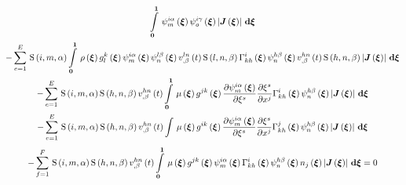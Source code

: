 \begin{multline}
{    \gint{\vectr{0}}{\vectr{1}}{\idxgbfn{i}{m}{\alpha}{\vectr{\xi}}\idxgbfn{i}{o}{\gamma}{\vectr{\xi}}
      \abs{\fnof{\matr{J}}{\vectr{\xi}}}}{\vectr{\xi}}}\\
  -\gsum{e=1}{E}{\idxgsf{i}{m}{\alpha}\gint{\vectr{0}}{\vectr{1}}{\fnof{\rho}{\vectr{\xi}}
      \fnof{g^{k}_{l}}{\vectr{\xi}}\idxgbfn{i}{m}{\alpha}{\vectr{\xi}}\idxgbfn{l}{n}{\beta}{\vectr{\xi}}
      \fnof{\idxnodedof{v}{l}{n}{\beta}}{t}\idxgsf{l}{n}{\beta}
      \fnof{\christoffel{i}{k}{h}}{\vectr{\xi}}
      \idxgbfn{h}{n}{\beta}{\vectr{\xi}}\fnof{\idxnodedof{v}{h}{n}{\beta}}{t}\idxgsf{h}{n}{\beta}
      \abs{\fnof{\matr{J}}{\vectr{\xi}}}}{\vectr{\xi}}}\\
  -\gsum{e=1}{E}{\idxgsf{i}{m}{\alpha}\idxgsf{h}{n}{\beta}\fnof{\idxnodedof{v}{h}{n}{\beta}}{t}
    \gint{\vectr{0}}{\vectr{1}}{\fnof{\mu}{\vectr{\xi}}\fnof{g^{jk}}{\vectr{\xi}}
      \delby{\idxgbfn{i}{m}{\alpha}{\vectr{\xi}}}{\xi^{s}}\delby{\xi^{s}}{x^{j}}
      \fnof{\christoffel{i}{k}{h}}{\vectr{\xi}}\idxgbfn{h}{n}{\beta}{\vectr{\xi}}    
    \abs{\fnof{\matr{J}}{\vectr{\xi}}}}{\vectr{\xi}}}\\
  -\gsum{e=1}{E}{\idxgsf{i}{m}{\alpha}\idxgsf{h}{n}{\beta}\fnof{\idxnodedof{v}{h}{n}{\beta}}{t}
    \gint{}{}{\fnof{\mu}{\vectr{\xi}}\fnof{g^{ik}}{\vectr{\xi}}
      \delby{\idxgbfn{i}{m}{\alpha}{\vectr{\xi}}}{\xi^{s}}\delby{\xi^{s}}{x^{j}}
      \fnof{\christoffel{j}{k}{h}}{\vectr{\xi}}\idxgbfn{h}{n}{\beta}{\vectr{\xi}}        
    \abs{\fnof{\matr{J}}{\vectr{\xi}}}}{\vectr{\xi}}}\\
  -\gsum{f=1}{F}{\idxgsf{i}{m}{\alpha}\idxgsf{h}{n}{\beta}\fnof{\idxnodedof{v}{h}{n}{\beta}}{t}
    \gint{\vectr{0}}{\vectr{1}}{\fnof{\mu}{\vectr{\xi}}\fnof{g^{jk}}{\vectr{\xi}}\idxgbfn{i}{m}{\alpha}{\vectr{\xi}}
      \fnof{\christoffel{i}{k}{h}}{\vectr{\xi}}\idxgbfn{h}{n}{\beta}{\vectr{\xi}}\fnof{n_{j}}{\vectr{\xi}}
      \abs{\fnof{\matr{J}}{\vectr{\xi}}}}{\vectr{\xi}}}=0
  \label{eqn:NSEFEM4}
\end{multline}

